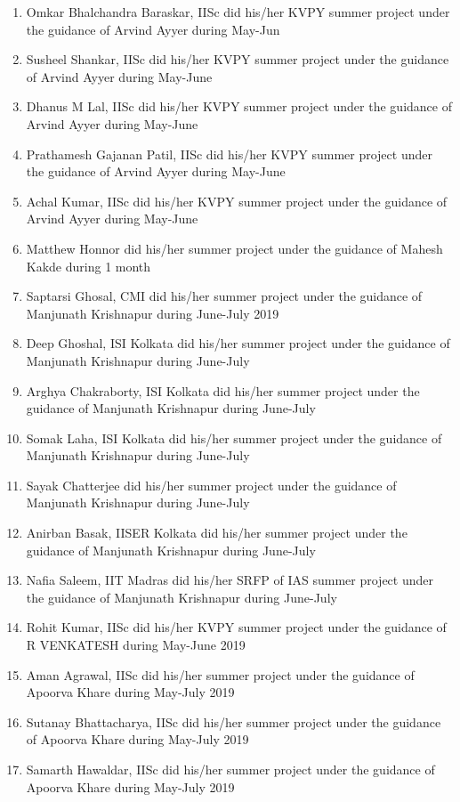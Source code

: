 \begin{enumerate}
\item Omkar Bhalchandra Baraskar, IISc did his/her KVPY summer project under the guidance of Arvind Ayyer during May-Jun
\item Susheel Shankar, IISc did his/her KVPY summer project under the guidance of Arvind Ayyer during May-June
\item Dhanus M Lal, IISc did his/her KVPY summer project under the guidance of Arvind Ayyer during May-June
\item Prathamesh Gajanan Patil, IISc did his/her KVPY summer project under the guidance of Arvind Ayyer during May-June
\item Achal Kumar, IISc did his/her KVPY summer project under the guidance of Arvind Ayyer during May-June
\item Matthew Honnor did his/her  summer project under the guidance of Mahesh Kakde during 1 month
\item Saptarsi Ghosal, CMI did his/her  summer project under the guidance of Manjunath Krishnapur during June-July 2019
\item Deep Ghoshal, ISI Kolkata did his/her  summer project under the guidance of Manjunath Krishnapur during June-July 
\item Arghya Chakraborty, ISI Kolkata did his/her  summer project under the guidance of Manjunath Krishnapur during June-July 
\item Somak Laha, ISI Kolkata did his/her  summer project under the guidance of Manjunath Krishnapur during June-July
\item Sayak Chatterjee did his/her  summer project under the guidance of Manjunath Krishnapur during June-July
\item Anirban Basak, IISER Kolkata did his/her  summer project under the guidance of Manjunath Krishnapur during June-July
\item Nafia Saleem, IIT Madras did his/her SRFP of IAS summer project under the guidance of Manjunath Krishnapur during June-July
\item Rohit Kumar, IISc did his/her KVPY summer project under the guidance of R VENKATESH during May-June 2019
\item Aman Agrawal, IISc did his/her  summer project under the guidance of Apoorva Khare during May-July 2019
\item Sutanay Bhattacharya, IISc did his/her  summer project under the guidance of Apoorva Khare during May-July 2019
\item Samarth Hawaldar, IISc did his/her  summer project under the guidance of Apoorva Khare during May-July 2019

\end{enumerate}
